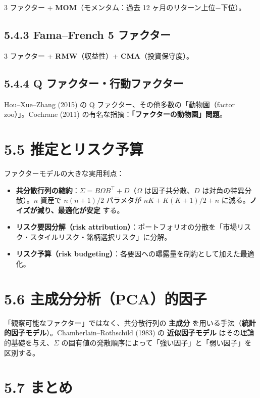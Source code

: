 \documentclass[11pt,a4paper]{report}
\begin{document}
3 ファクター + \textbf{MOM}（モメンタム：過去 12 ヶ月のリターン上位−下位）。

\subsection{5.4.3 Fama–French 5 ファクター}

3 ファクター + \textbf{RMW}（収益性）+ \textbf{CMA}（投資保守度）。

\subsection{5.4.4 Q ファクター・行動ファクター}

Hou–Xue–Zhang (2015) の Q ファクター、その他多数の「動物園（factor zoo）」。Cochrane (2011) の有名な指摘：\textbf{「ファクターの動物園」問題}。

\section{5.5 推定とリスク予算}

ファクターモデルの大きな実用利点：

\begin{itemize}
\item \textbf{共分散行列の縮約}：$\Sigma = B \Omega B^\top + D$（$\Omega$ は因子共分散、$D$ は対角の特異分散）。$n$ 資産で $n(n+1)/2$ パラメタが $nK + K(K+1)/2 + n$ に減る。\textbf{ノイズが減り、最適化が安定} する。
\item \textbf{リスク要因分解（risk attribution）}：ポートフォリオの分散を「市場リスク・スタイルリスク・銘柄選択リスク」に分解。
\item \textbf{リスク予算（risk budgeting）}：各要因への曝露量を制約として加えた最適化。
\end{itemize}

\section{5.6 主成分分析（PCA）的因子}

「観察可能なファクター」ではなく、共分散行列の \textbf{主成分} を用いる手法（\textbf{統計的因子モデル}）。Chamberlain–Rothschild (1983) の \textbf{近似因子モデル} はその理論的基礎を与え、$\Sigma$ の固有値の発散順序によって「強い因子」と「弱い因子」を区別する。

\section{5.7 まとめ}
\end{document}
